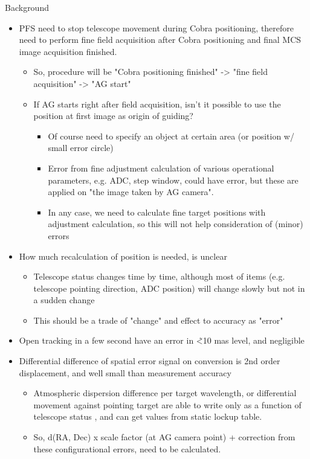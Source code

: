\documentclass[a4paper,notitlepage]{article}
\begin{document}
Background
\begin{itemize}
  \item PFS need to stop telescope movement during Cobra positioning, therefore need to perform fine field acquisition after Cobra positioning and final MCS image acquisition finished.
  \begin{itemize}
    \item So, procedure will be "Cobra positioning finished" -> "fine field acquisition" -> "AG start"
    \item If AG starts right after field acquisition, isn’t it possible to use the position at first image as origin of guiding?
    \begin{itemize}
      \item Of course need to specify an object at certain area (or position w/ small error circle)
      \item Error from fine adjustment calculation of various operational parameters, e.g. ADC, step window, could have error, but these are applied on "the image taken by AG camera". 
      \item In any case, we need to calculate fine target positions with adjustment calculation, so this will not help consideration of (minor) errors
    \end{itemize}
  \end{itemize}
  \item How much recalculation of position is needed, is unclear
  \begin{itemize}
    \item Telescope status changes time by time, although most of items (e.g. telescope pointing direction, ADC position) will change slowly but not in a sudden change
    \item This should be a trade of "change" and effect to accuracy as "error"
  \end{itemize}
  \item Open tracking in a few second have an error in \~<10 mas level, and negligible
  \item Differential difference of spatial error signal on conversion is 2nd order displacement, and well small than measurement accuracy
  \begin{itemize}
    \item Atmospheric dispersion difference per target wavelength, or differential movement against pointing target are able to write only as a function of telescope status , and can get values from static lockup table.
    \item So, d(RA, Dec) x scale factor (at AG camera point) + correction from these configurational errors, need to be calculated.
  \end{itemize}
\end{itemize}
\end{document}
